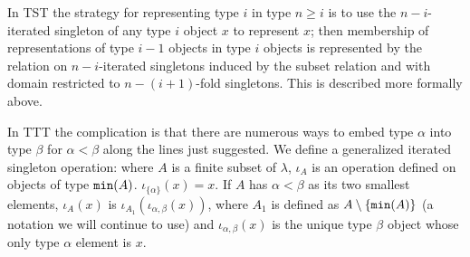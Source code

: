 \documentclass[112pt]{article}
\theoremstyle{definition}
\theoremstyle{remark}
\begin{document}
In TST the strategy for representing type $i$ in type $n\geq i$  is to use the $n-i$-iterated singleton of any type $i$ object $x$ to represent $x$;  then membership of representations of type $i-1$ objects in type
$i$ objects is represented by the relation on $n-i$-iterated singletons induced by the subset relation and with domain restricted to $n-(i+1)$-fold singletons.  This is described more formally above.

In TTT the complication is that there are numerous ways to embed type $\alpha$ into type $\beta$ for $\alpha<\beta$ along the lines just suggested.    We define a generalized
iterated singleton operation:  where $A$ is a finite subset of $\lambda$, $\iota_A$ is an operation defined on objects of type ${\tt min}(A)$.  $\iota_{\{\alpha\}}(x)=x$.
If $A$ has $\alpha<\beta$ as its two smallest elements, $\iota_A(x)$ is  $\iota_{A_1}(\iota_{\alpha,\beta}(x))$, where $A_1$ is defined as $A \setminus \{{\tt min}(A)\}$ (a notation we will continue to use) and $\iota_{\alpha,\beta}(x)$ is the unique type $\beta$ object whose only type $\alpha$ element is $x$.
\end{document}
